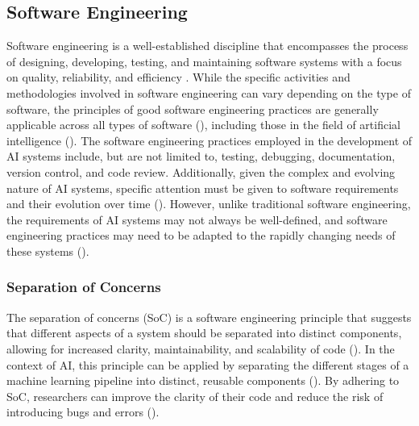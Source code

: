 \subsection{Software Engineering}
Software engineering is a well-established discipline that encompasses the process of designing, developing, testing, and maintaining software systems with a focus on quality, reliability, and efficiency \cite{pressman2010software}. While the specific activities and methodologies involved in software engineering can vary depending on the type of software, the principles of good software engineering practices are generally applicable across all types of software (\cite{pressman2010software}), including those in the field of artificial intelligence (\cite{se4dl,wan2019does,martinez2022softwareAI,davis2011understandingmodularity}). The software engineering practices employed in the development of AI systems include, but are not limited to, testing, debugging, documentation, version control, and code review. Additionally, given the complex and evolving nature of AI systems, specific attention must be given to software requirements and their evolution over time (\cite{heyn2021requirement,belani2019requirements}). However, unlike traditional software engineering, the requirements of AI systems may not always be well-defined, and software engineering practices may need to be adapted to the rapidly changing needs of these systems (\cite{heyn2021requirement,belani2019requirements}). 


\subsubsection{Separation of Concerns}
 The separation of concerns (SoC) is a software engineering principle that suggests that different aspects of a system should be separated into distinct components, allowing for increased clarity, maintainability, and scalability of code (\cite{pressman2010software, de2002importance}). In the context of AI, this principle can be applied by separating the different stages of a machine learning pipeline into distinct, reusable components (\cite{mo2016decoupling,mo2016decoupling,pressman2010software, de2002importance}). By adhering to SoC, researchers can improve the clarity of their code and reduce the risk of introducing bugs and errors (\cite{mo2016decoupling,mo2016decoupling,pressman2010software, de2002importance}).


